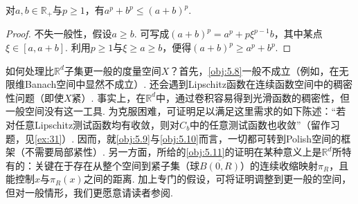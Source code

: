 \begin{lemma}\label{obj:5.12}
对$a,b\in\mathbb R_+$与$p\ge1$，有$a^p+b^p\le(a+b)^p$.
\end{lemma}
\begin{proof}
不失一般性，假设$a\ge b$. 可写成$(a+b)^p=a^p+p\xi^{p-1}b$，其中某点$\xi\in[a,a+b]$. 利用$p\ge1$与$\xi\ge a\ge b$，便得$(a+b)^p\ge a^p+b^p$.
\end{proof}

\begin{remark}\label{obj:5.13}
如何处理比$\mathbb R^d$子集更一般的度量空间$X$？首先，\autoref{obj:5.8}一般不成立（例如，在无限维Banach空间中显然不成立）. 还会遇到Lipschitz函数在连续函数空间中的稠密性问题（即使$X$紧）. 事实上，在$\mathbb R^d$中，通过卷积容易得到光滑函数的稠密性，但一般空间没有这一工具. 为克服困难，可证明足以满足这里需求的如下陈述：“若对任意Lipschitz测试函数均有收敛，则对$C_b$中的任意测试函数也收敛”（留作习题，见\autoref{ex:31}）. 因而，就\autoref{obj:5.9}与\autoref{obj:5.10}而言，一切都可转到Polish空间的框架（不需要局部紧性）. 另一方面，所给的\autoref{obj:5.11}的证明在某种意义上是$\mathbb R^d$所特有的：关键在于存在从整个空间到紧子集（球$\overline{B(0,R)}$）的连续收缩映射$\pi_R$，且能控制$x$与$\pi_R(x)$之间的距离. 加上专门的假设，可将证明调整到更一般的空间，但对一般情形，我们更愿意请读者参阅\cite{b9,b15}.
\end{remark}
